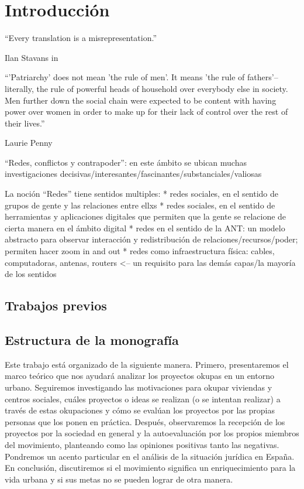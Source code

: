 \section{Introducción}

\epigraph{``Every translation is a misrepresentation.''}{Ilan Stavans in~\autocite{Albin2005}}
\epigraph{``'Patriarchy' does not mean 'the rule of men'. It means 'the rule of fathers'--literally, the rule of powerful heads of household over everybody else in society. Men further down the social chain were expected to be content with having power over women in order to make up for their lack of control over the rest of their lives.''}{Laurie Penny~\autocite[69]{Penny2014}}

``Redes, conflictos y contrapoder'': en este ámbito se ubican muchas investigaciones decisivas/interesantes/fascinantes/substanciales/valiosas

La noción ``Redes'' tiene sentidos multiples:
* redes sociales, en el sentido de grupos de gente y las relaciones entre ellxs
* redes sociales, en el sentido de herramientas y aplicaciones digitales que permiten que la gente se relacione de cierta manera en el ámbito digital
* redes en el sentido de la ANT: un modelo abstracto para observar interacción y redistribución de relaciones/recursos/poder; permiten hacer zoom in and out
* redes como infraestructura física: cables, computadoras, antenas, routers <-- un requisito para las demás capas/la mayoría de los sentidos

\subsection{Trabajos previos}


\subsection{Estructura de la monografía}

Este trabajo está organizado de la siguiente manera.
Primero, presentaremos el marco teórico que nos ayudará analizar los proyectos okupas en un entorno urbano.
Seguiremos investigando las motivaciones para okupar viviendas y centros sociales,
cuáles proyectos o ideas se realizan (o se intentan realizar) a través de estas okupaciones
y cómo se evalúan los proyectos por las propias personas que los ponen en práctica.
Después, observaremos la recepción de los proyectos por la sociedad en general y la autoevaluación por los propios miembros del movimiento, planteando como las opiniones positivas tanto las negativas.
Pondremos un acento particular en el análisis de la situación jurídica en España.
En conclusión, discutiremos si el movimiento significa un enriquecimiento para la vida urbana y si sus metas no se pueden lograr de otra manera.

